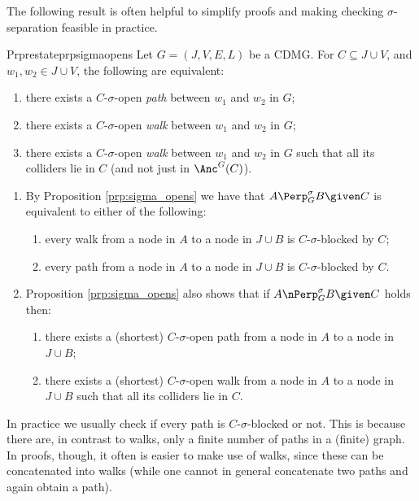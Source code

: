 The following result is often helpful to simplify proofs and making checking $\sigma$-separation feasible in practice.

\begin{restatable}{Prp}{restateprpsigmaopens}\label{prp:sigma_opens}
  Let $G=(J,V,E,L)$ be a CDMG. For $C \subseteq J \cup V$, and $w_1, w_2 \in J \cup V$, the following are
  equivalent:
  \begin{enumerate}
      \item there exists a $C$-$\sigma$-open \emph{path} between $w_1$ and $w_2$ in $G$;
      \item there exists a $C$-$\sigma$-open \emph{walk} between $w_1$ and $w_2$ in $G$;
      \item there exists a $C$-$\sigma$-open \emph{walk} between $w_1$ and $w_2$ in $G$ such that all its colliders lie in $C$ (and not just in $\Anc^G(C)$).
  \end{enumerate}
\end{restatable}

\begin{Rem}
    \begin{enumerate}
        \item By Proposition \ref{prp:sigma_opens} we have that $A \Perp^\sigma_G B \given C$ is equivalent to either of the following:
  \begin{enumerate}
      \item every walk from a node in $A$ to a node in $J \cup B$ is $C$-$\sigma$-blocked by $C$;
      \item every path from a node in $A$ to a node in $J \cup B$ is $C$-$\sigma$-blocked by $C$.
  \end{enumerate}
    \item Proposition \ref{prp:sigma_opens} also shows that if $A \nPerp^\sigma_G B \given C$ holds then:
  \begin{enumerate}
      \item there exists a (shortest) $C$-$\sigma$-open path from a node in $A$ to a node in $J \cup B$;
      \item there exists a (shortest) $C$-$\sigma$-open walk from a node in $A$ to a node in $J \cup B$ such that all its colliders lie in $C$.
  \end{enumerate}
  \end{enumerate}
  In practice we usually check if every path is $C$-$\sigma$-blocked or not. This is because there are, in contrast to walks, only a finite number of paths in a (finite) graph. In proofs, though, it often is easier to make use of walks, since these can be concatenated into walks (while one cannot in general concatenate two paths and again obtain a path).
\end{Rem}

